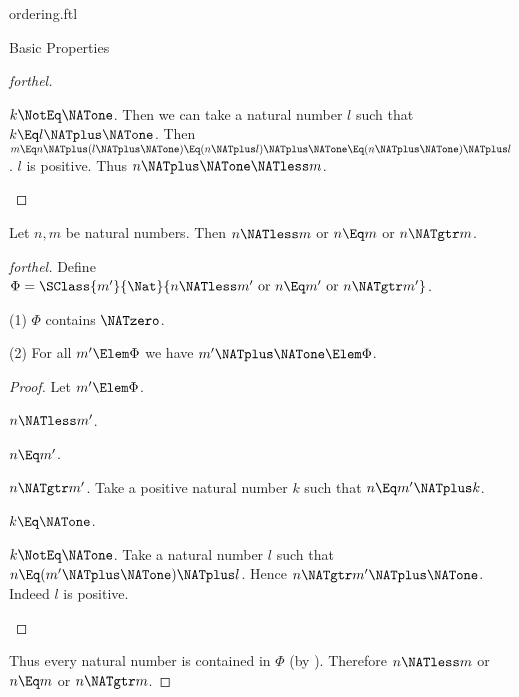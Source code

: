 \documentclass{stex}
\begin{document}
\begin{smodule}{ordering.ftl}
\begin{sfragment}{Basic Properties}
\begin{proof}[forthel]
    \begin{case}{$k \NotEq \NATone$.}
      Then we can take a natural number $l$ such that $k \Eq l \NATplus \NATone$.
      Then $m
        \Eq n \NATplus (l \NATplus \NATone)
        \Eq (n \NATplus l) \NATplus \NATone
        \Eq (n \NATplus \NATone) \NATplus l$.
      $l$ is positive.
      Thus $n \NATplus \NATone \NATless m$.
    \end{case}
  \end{proof}

  \begin{proposition}[forthel]
    Let $n, m$ be natural numbers.
    Then $n \NATless m$ or $n \Eq m$ or $n \NATgtr m$.
  \end{proposition}
  \begin{proof}[forthel]
    Define $\Phi = \SClass{m'}{\Nat}{n \NATless m'\text{ or }n \Eq m'\text{ or }n \NATgtr m'}$.

    (1) $\Phi$ contains $\NATzero$.

    (2) For all $m' \Elem \Phi$ we have $m' \NATplus \NATone \Elem \Phi$.
    \begin{proof}
      Let $m' \Elem \Phi$.

      \begin{case}{$n \NATless m'$.} \end{case}

      \begin{case}{$n \Eq m'$.} \end{case}

      \begin{case}{$n \NATgtr m'$.}
        Take a positive natural number $k$ such that $n \Eq m' \NATplus k$.

        \begin{case}{$k \Eq \NATone$.} \end{case}

        \begin{case}{$k \NotEq \NATone$.}
          Take a natural number $l$ such that $n \Eq (m' \NATplus \NATone) \NATplus l$.
          Hence $n \NATgtr m' \NATplus \NATone$.
          Indeed $l$ is positive.
        \end{case}
      \end{case}
    \end{proof}

    Thus every natural number is contained in $\Phi$ (by ).
    Therefore $n \NATless m$ or $n \Eq m$ or $n \NATgtr m$.
  \end{proof}


\end{sfragment}
\end{smodule}
\end{document}
